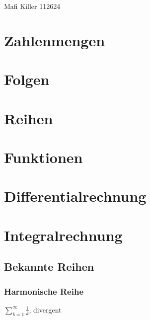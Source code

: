 \documentclass[a4paper, 8pt]{extarticle} %
\begin{document}
\setlength{\abovedisplayskip}{0.5pt}
\setlength{\belowdisplayskip}{0.5pt}
\renewcommand{\arraystretch}{0.5}
\titlespacing*{\section}
{0pt}{-2pt}{-2pt}
\titlespacing*{\subsection}
{0pt}{-2pt}{-2pt}
\titlespacing*{\subsubsection}
{0pt}{-2pt}{-2pt}



\hfill Mafi Killer 112624
\begin{multicols*}{4}

\section*{Zahlenmengen}

\section*{Folgen}

\section*{Reihen}

\section*{Funktionen}

\section*{Differentialrechnung}

\section*{Integralrechnung}


\subsection*{Bekannte Reihen}
\subsubsection*{Harmonische Reihe}
$\sum_{k=1}^\infty \frac{1}{k}$, divergent

\end{multicols*}
\end{document}
